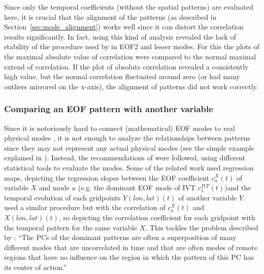 Since only the temporal coefficients (without the spatial patterns) are evaluated here, it is crucial that the alignment of the patterns (as described in Section~\ref{sec:mode_alignment}) works well since it can distort the correlation results significantly. 
In fact, using this kind of analysis revealed the lack of stability of the procedure used by  in EOF2 and lesser modes. 
For this the plots of the maximal absolute value of correlation were compared to the normal maximal extend of correlation. 
If the plot of absolute correlation revealed a consistently high value, but the normal correlation fluctuated around zero (or had many outliers mirrored on the x-axis), the alignment of patterns did not work correctly. 


\subsubsection{Comparing an EOF pattern with another variable}

Since it is notoriously hard to connect (mathematical) EOF modes to real physical modes \cite{hannachi_empirical_2007, dommenget_cautionary_2002}, it is not enough to analyze the relationships between patterns since they may not represent any actual physical modes (see the simple example explained in ). 
Instead, the recommendations of  were followed, using different statistical tools to evaluate the modes. 
Some of the related work \cite{zou_interdecadal_2018, zhou_atmospheric_2005, li_quasi-4-yr_2012} used regression maps, depicting the regression slopes between the EOF coefficient $c_a^X(t)$ of variable $X$ and mode $a$ (e.g. the dominant EOF mode of IVT $c_1^{IVT}(t)$)and the temporal evolution of each gridpoints $Y(lon, lat)(t)$ of another variable $Y$. 
 used a similar procedure but with the correlation of $c_a^X(t)$ and $X(lon, lat)(t)$, so depicting the correlation coefficient for each gridpoint with the temporal pattern for the same variable $X$. 
This tackles the problem described by \citeauthor{dommenget_cautionary_2002}: \enquote{The PCs of the dominant patterns are often a superposition of many different modes that are uncorrelated in time and that are often modes of remote regions that have no influence on the region in which the pattern of this PC has its center of action.} \cite{dommenget_cautionary_2002} 


